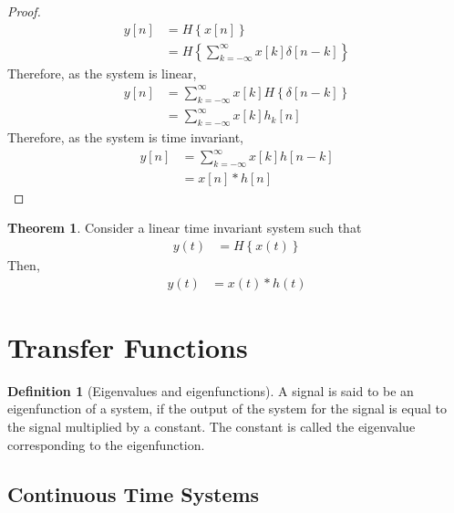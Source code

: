 \documentclass[titlepage, fleqn, a4paper, 12pt, twoside]{article}
\theoremstyle{definition}
\newtheorem{definition}{Definition}
\theoremstyle{theorem}
\newtheorem{theorem}{Theorem}
\begin{document}
\begin{proof}
	\begin{align*}
		y[n] & = H\left\{ x[n] \right\} \\
                     & = H\left\{ \sum\limits_{k = -\infty}^{\infty} x[k] \delta[n - k] \right\}
	\end{align*}
	Therefore, as the system is linear,
	\begin{align*}
		y[n] & = \sum\limits_{k = -\infty}^{\infty} x[k] H\left\{ \delta[n - k] \right\} \\
                     & = \sum\limits_{k = -\infty}^{ \infty} x[k] h_k[n]
	\end{align*}
	Therefore, as the system is time invariant,
	\begin{align*}
		y[n] & = \sum\limits_{k = -\infty}^{\infty} x[k] h[n - k] \\
                     & = x[n] \ast h[n]
	\end{align*}
\end{proof}

\begin{theorem}
	Consider a linear time invariant system such that
	\begin{align*}
		y(t) & = H\left\{ x(t) \right\}
	\end{align*}
	Then,
	\begin{align*}
		y(t) & = x(t) \ast h(t)
	\end{align*}
\end{theorem}

\section{Transfer Functions}

\begin{definition}[Eigenvalues and eigenfunctions]
	A signal is said to be an eigenfunction of a system, if the output of the system for the signal is equal to the signal multiplied by a constant.
	The constant is called the eigenvalue corresponding to the eigenfunction.
\end{definition}

\subsection{Continuous Time Systems}
\end{document}
